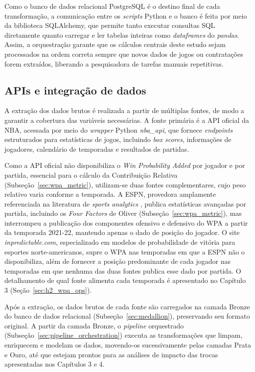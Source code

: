 Como o banco de dados relacional PostgreSQL é o destino final de cada transformação, a comunicação entre os \textit{scripts} Python e o banco é feita por meio da biblioteca SQLAlchemy, que permite tanto executar consultas SQL diretamente quanto carregar e ler tabelas inteiras como \textit{dataframes} do \textit{pandas}. Assim, a orquestração garante que os cálculos centrais deste estudo sejam processados na ordem correta sempre que novos dados de jogos ou contratações forem extraídos, liberando a pesquisadora de tarefas manuais repetitivas.

\subsection{APIs e integração de dados}
\label{sec:api_integration}

A extração dos dados brutos é realizada a partir de múltiplas fontes, de modo a garantir a cobertura das variáveis necessárias. A fonte primária é a API oficial da NBA, acessada por meio do \textit{wrapper} Python \textit{nba\_api}, que fornece \textit{endpoints} estruturados para estatísticas de jogos, incluindo \textit{box scores}, informações de jogadores, calendário de temporadas e resultados de partidas.

Como a API oficial não disponibiliza o \textit{Win Probability Added} por jogador e por partida, essencial para o cálculo da Contribuição Relativa (Subseção~\ref{sec:wpa_metric}), utilizam-se duas fontes complementares, cujo peso relativo varia conforme a temporada. A ESPN, provedora amplamente referenciada na literatura de \textit{sports analytics} \citep{kubatko2007}, publica estatísticas avançadas por partida, incluindo os \textit{Four Factors} de Oliver (Subseção~\ref{sec:wpa_metric}), mas interrompeu a publicação dos componentes ofensivo e defensivo do WPA a partir da temporada 2021-22, mantendo apenas o dado de posição do jogador. O site \textit{inpredictable.com}, especializado em modelos de probabilidade de vitória para esportes norte-americanos, supre o WPA nas temporadas em que a ESPN não o disponibiliza, além de fornecer a posição predominante de cada jogador nas temporadas em que nenhuma das duas fontes publica esse dado por partida. O detalhamento de qual fonte alimenta cada temporada é apresentado no Capítulo 3 (Seção~\ref{sec:h2_wpa_ops}).

Após a extração, os dados brutos de cada fonte são carregados na camada Bronze do banco de dados relacional (Subseção~\ref{sec:medallion}), preservando seu formato original. A partir da camada Bronze, o \textit{pipeline} orquestrado (Subseção~\ref{sec:pipeline_orchestration}) executa as transformações que limpam, enriquecem e modelam os dados, movendo-os sucessivamente pelas camadas Prata e Ouro, até que estejam prontos para as análises de impacto das trocas apresentadas nos Capítulos 3 e 4.

